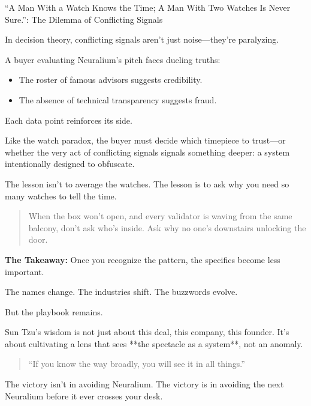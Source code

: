 \begin{HistoricalSidebar}{“A Man With a Watch Knows the Time; A Man With Two Watches Is Never Sure.”: The Dilemma of Conflicting Signals}

  In decision theory, conflicting signals aren’t just noise—they’re paralyzing.

  \medskip
  
  A buyer evaluating Neuralium’s pitch faces dueling truths:
  
  \begin{itemize}
    \item The roster of famous advisors suggests credibility.
    \item The absence of technical transparency suggests fraud.
  \end{itemize}

  Each data point reinforces its side.

  Like the watch paradox, the buyer must decide which timepiece to trust—or whether the very act of conflicting signals signals something deeper: a system intentionally designed to obfuscate.

  \medskip

  The lesson isn’t to average the watches.  
  The lesson is to ask why you need so many watches to tell the time.

  \medskip

  \begin{quote}
  When the box won’t open, and every validator is waving from the same balcony, don’t ask who’s inside.  
  Ask why no one’s downstairs unlocking the door.
  \end{quote}

\end{HistoricalSidebar}

\medskip

\textbf{The Takeaway:}  
Once you recognize the pattern, the specifics become less important.

The names change. The industries shift. The buzzwords evolve.

But the playbook remains.

Sun Tzu’s wisdom is not just about this deal, this company, this founder.  
It’s about cultivating a lens that sees **the spectacle as a system**, not an anomaly.

\begin{quote}
  “If you know the way broadly, you will see it in all things.”
\end{quote}

The victory isn’t in avoiding Neuralium.  
The victory is in avoiding the next Neuralium before it ever crosses your desk.

